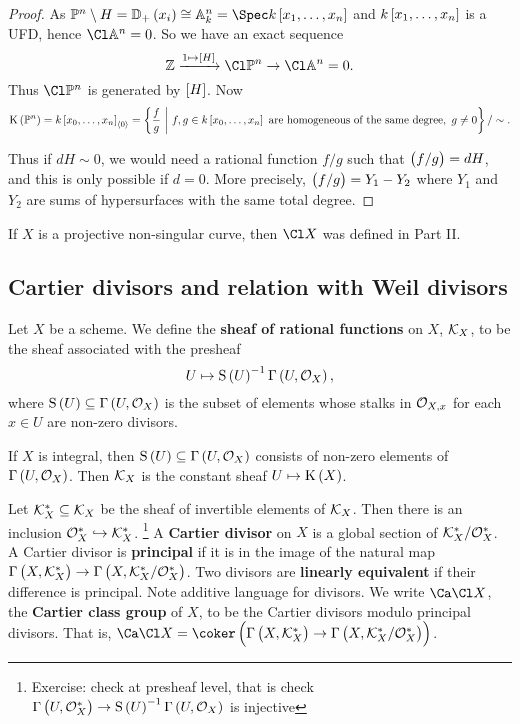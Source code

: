 \begin{proof}
As $ \PP^n \setminus H = \DD_+\br{x_i} \cong \AA_k^n = \Spec k\sbr{x_1, \dots, x_n} $ and $ k\sbr{x_1, \dots, x_n} $ is a UFD, hence $ \Cl \AA^n = 0 $. So we have an exact sequence
$$ \ZZ \xrightarrow{1 \mapsto \sbr{H}} \Cl \PP^n \to \Cl \AA^n = 0. $$
Thus $ \Cl \PP^n $ is generated by $ \sbr{H} $. Now
$$ \K\br{\PP^n} = k\sbr{x_0, \dots, x_n}_{\abr{0}} = \cbr{\dfrac{f}{g} \st f, g \in k\sbr{x_0, \dots, x_n} \ \text{are homogeneous of the same degree}, \ g \ne 0} / \sim. $$

\pagebreak

Thus if $ dH \sim 0 $, we would need a rational function $ f / g $ such that $ \br{f / g} = dH $, and this is only possible if $ d = 0 $. More precisely, $ \br{f / g} = Y_1 - Y_2 $ where $ Y_1 $ and $ Y_2 $ are sums of hypersurfaces with the same total degree.
\end{proof}

\begin{remark*}
If $ X $ is a projective non-singular curve, then $ \Cl X $ was defined in Part II.
\end{remark*}

\subsection{Cartier divisors and relation with Weil divisors}

\begin{definition*}
Let $ X $ be a scheme. We define the \textbf{sheaf of rational functions} on $ X $, $ \mathcal{K}_X $, to be the sheaf associated with the presheaf
$$ U \mapsto \S\br{U}^{-1}\Gamma\br{U, \OOO_X}, $$
where $ \S\br{U} \subseteq \Gamma\br{U, \OOO_X} $ is the subset of elements whose stalks in $ \mathcal{O}_{X, x} $ for each $ x \in U $ are non-zero divisors.
\end{definition*}

\begin{example*}
If $ X $ is integral, then $ \S\br{U} \subseteq \Gamma\br{U, \OOO_X} $ consists of non-zero elements of $ \Gamma\br{U, \OOO_X} $. Then $ \mathcal{K}_X $ is the constant sheaf $ U \mapsto \K\br{X} $.
\end{example*}

\begin{definition*}
Let $ \mathcal{K}_X^* \subseteq \mathcal{K}_X $ be the sheaf of invertible elements of $ \mathcal{K}_X $. Then there is an inclusion $ \mathcal{O}_X^* \hookrightarrow \mathcal{K}_X^* $. \footnote{Exercise: check at presheaf level, that is check $ \Gamma\br{U, \OOO_X^*} \to \S\br{U}^{-1}\Gamma\br{U, \OOO_X} $ is injective} A \textbf{Cartier divisor} on $ X $ is a global section of $ \mathcal{K}_X^* / \mathcal{O}_X^* $. A Cartier divisor is \textbf{principal} if it is in the image of the natural map $ \Gamma\br{X, \KKK_X^*} \to \Gamma\br{X, \KKK_X^* / \OOO_X^*} $. Two divisors are \textbf{linearly equivalent} if their difference is principal. Note additive language for divisors. We write $ \Ca\Cl X $, the \textbf{Cartier class group} of $ X $, to be the Cartier divisors modulo principal divisors. That is, $ \Ca\Cl X = \coker \br{\Gamma\br{X, \KKK_X^*} \to \Gamma\br{X, \KKK_X^* / \OOO_X^*}} $.
\end{definition*}

